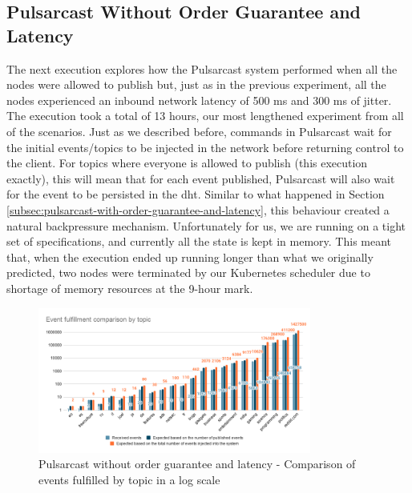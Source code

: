 \subsection{Pulsarcast Without Order Guarantee and Latency}\label{subsec:pulsarcast-without-order-guarantee-and-latency}

The next execution explores how the Pulsarcast system performed when all the
nodes were allowed to publish but, just as in the previous experiment, all the
nodes experienced an inbound network latency of 500 ms and 300 ms of jitter.
The execution took a total of 13 hours, our most lengthened experiment from all
of the scenarios. Just as we described before, commands in Pulsarcast wait for
the initial events/topics to be injected in the network before returning
control to the client. For topics where everyone is allowed to publish (this
execution exactly), this will mean that for each event published, Pulsarcast
will also wait for the event to be persisted in the \acrshort{dht}. Similar to
what happened in Section
\ref{subsec:pulsarcast-with-order-guarantee-and-latency}, this behaviour
created a natural backpressure mechanism. Unfortunately for us, we are running
on a tight set of specifications, and currently all the state is kept in
memory. This meant that, when the execution ended up running longer than what
we originally predicted, two nodes were terminated by our Kubernetes scheduler
due to shortage of memory resources at the 9-hour mark.

\begin{figure}[!htb]
  \centering
  \includegraphics[width=0.8\textwidth]{../images/graph-pulsarcast-latency-event-fulfillment-comparison.png}
  \caption{Pulsarcast without order guarantee and latency - Comparison of events fulfilled by topic in a log scale}
  \label{fig:graph-pulsarcast-latency-event-fulfillment-comparison}
\end{figure}

